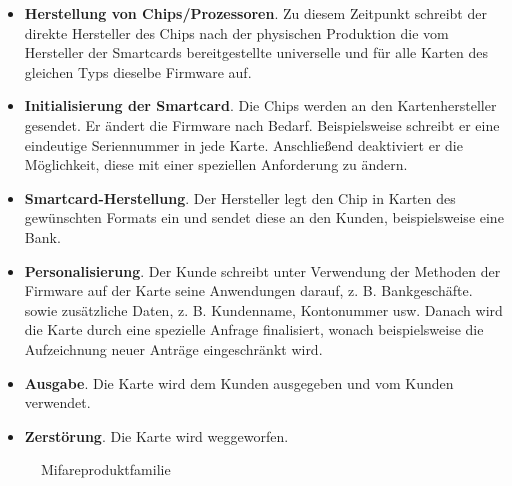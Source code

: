 \begin{itemize}
	\item \textbf{Herstellung von Chips/Prozessoren}. Zu diesem Zeitpunkt schreibt der direkte Hersteller des Chips nach der physischen Produktion die vom Hersteller der Smartcards bereitgestellte universelle und für alle Karten des gleichen Typs dieselbe Firmware auf.
\item \textbf{Initialisierung der Smartcard}. Die Chips werden an den Kartenhersteller gesendet. Er ändert die Firmware nach Bedarf. Beispielsweise schreibt er eine eindeutige Seriennummer in jede Karte. Anschließend deaktiviert er die Möglichkeit, diese mit einer speziellen Anforderung zu ändern.
\item \textbf{Smartcard-Herstellung}. Der Hersteller legt den Chip in Karten des gewünschten Formats ein und sendet diese an den Kunden, beispielsweise eine Bank.
\item \textbf{Personalisierung}. Der Kunde schreibt unter Verwendung der Methoden der Firmware auf der Karte seine Anwendungen darauf, z. B. Bankgeschäfte. sowie zusätzliche Daten, z. B. Kundenname, Kontonummer usw. Danach wird die Karte durch eine spezielle Anfrage finalisiert, wonach beispielsweise die Aufzeichnung neuer Anträge eingeschränkt wird.
\item \textbf{Ausgabe}. Die Karte wird dem Kunden ausgegeben und vom Kunden verwendet.
\item \textbf{Zerstörung}. Die Karte wird weggeworfen.
\end{itemize}

\begin{figure}
	\centering
	\caption{Mifareproduktfamilie}
	\label{fig:mifare}
\end{figure}

